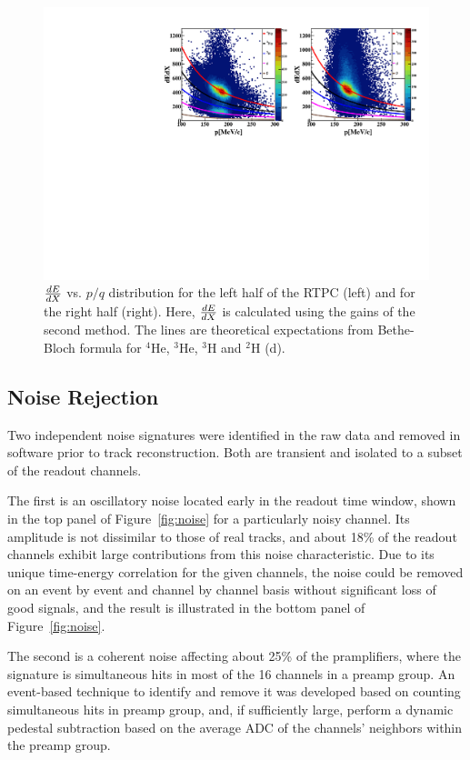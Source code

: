 \documentclass[twocolumn,showpacs,superscriptaddress,groupedaddress]{revtex4}
\begin{document}
\begin{figure}[tb]
\centering
\includegraphics[scale=0.45]{fig/f_dedx_p_exp_2nd.pdf}
\caption{$\small{\frac{dE}{dX}}$ vs. $p/q$ distribution for the left half of 
   the RTPC (left) and for the right half (right). Here, 
   $\small{\frac{dE}{dX}}$ is calculated using the gains of the second method.  
   The lines are theoretical expectations from Bethe-Bloch formula for $^4$He, 
$^3$He, $^3$H and $^2$H (d).}
\label{fig:dedx_p_exp_2nd}
\end{figure}

\subsection{Noise Rejection}
Two independent noise signatures were identified in the raw data and removed in software prior to track reconstruction.  Both are transient and isolated to a subset of the readout channels. 

The first is an oscillatory noise located early in the readout time window, shown in the top panel of Figure~\ref{fig:noise} for a particularly noisy channel.  Its amplitude is not dissimilar to those of real tracks, and about 18\% of the readout channels exhibit large contributions from this noise characteristic.  Due to its unique time-energy correlation for the given channels, the noise could be removed on an event by event and channel by channel basis without significant loss of good signals, and the result is illustrated in the bottom panel of Figure~\ref{fig:noise}.

The second is a coherent noise affecting about 25\% of the pramplifiers, where the signature is simultaneous hits in most of the 16 channels in a preamp group.   An event-based technique to identify and remove it was developed based on counting simultaneous hits in preamp group, and, if sufficiently large, perform a dynamic pedestal subtraction based on the average ADC of the channels' neighbors within the preamp group.
\end{document}
